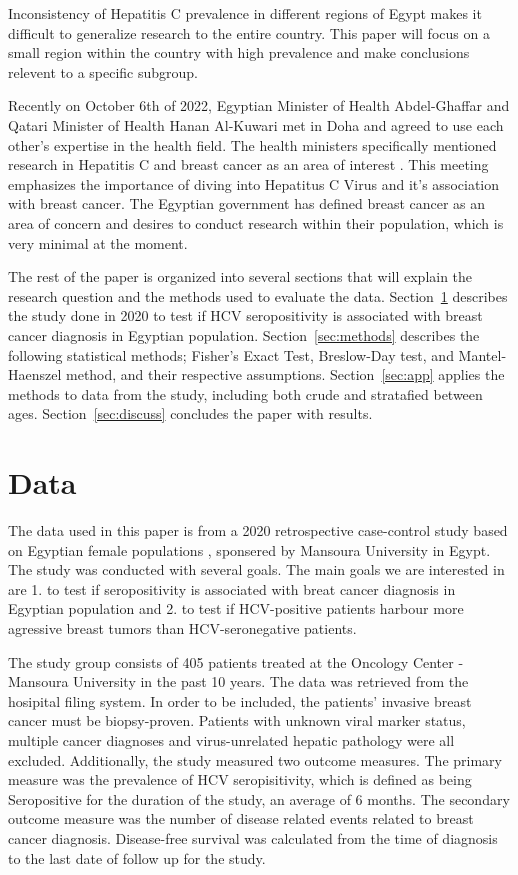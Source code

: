 \documentclass[12pt, titlepage]{article}
\begin{document}
Inconsistency of Hepatitis C prevalence in different regions of Egypt makes 
it difficult to generalize research to the entire country. This paper will 
focus on a small region within the country with high 
prevalence \citep{Hussein2021high} and make conclusions relevent to a specific 
subgroup. 

Recently on October 6th of 2022, Egyptian Minister of Health Abdel-Ghaffar and 
Qatari Minister of Health Hanan Al-Kuwari met in Doha and agreed to use each 
other's expertise in the health field. The health ministers specifically mentioned research 
in Hepatitis C and breast cancer as an area of interest \citep{arham2022egypt}. 
This meeting emphasizes the importance of diving into Hepatitus C Virus 
and it's association with breast cancer. The Egyptian government has defined 
breast cancer as an area of concern and desires to conduct research within their 
population, which is very minimal at the moment. 

The rest of the paper is organized into several sections that will explain the 
research question and the methods used to evaluate the data. Section~\ref{sec:data}
describes the study done in 2020 to test if HCV seropositivity is associated with 
breast cancer diagnosis in Egyptian population. Section~\ref{sec:methods} 
describes the following statistical methods; Fisher's Exact Test, Breslow-Day test,
and Mantel-Haenszel method, and their respective assumptions. 
Section~\ref{sec:app} applies the methods to data 
from the study, including both crude and stratafied between ages. 
Section~\ref{sec:discuss} concludes the paper with results. 



\section{Data}
\label{sec:data}

The data used in this paper is from a 2020 retrospective case-control 
study based on Egyptian female populations \citep{hussein2020association},
sponsered by Mansoura University in Egypt. The study was conducted with
several goals. The main goals we are interested in are 1. to test if seropositivity
is associated with breat cancer diagnosis in Egyptian population and 
2. to test if HCV-positive patients harbour more agressive breast tumors 
than HCV-seronegative patients. 

The study group consists of 405 patients treated at the Oncology Center 
- Mansoura University in the past 10 years. The data was retrieved from
the hosipital filing system. In order to be included, the patients'
invasive breast cancer must be biopsy-proven. Patients with unknown 
viral marker status, multiple cancer diagnoses and virus-unrelated 
hepatic pathology were all excluded. Additionally, the study measured
two outcome measures. The primary measure was the prevalence of 
HCV seropisitivity, which is defined as being Seropositive for the duration
of the study, an average of 6 months. The secondary outcome measure was
the number of disease related events related to breast cancer diagnosis. 
Disease-free survival was calculated from the time of diagnosis to the
last date of follow up for the study. 
\end{document}
